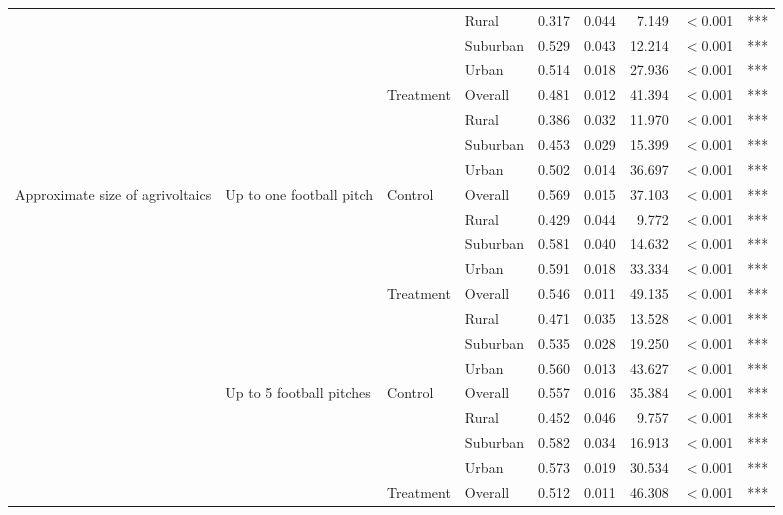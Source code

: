 \begin{longtable}[t]{>{\raggedright\arraybackslash}t{4cm}>{\raggedright\arraybackslash}t{4cm}>{\raggedright\arraybackslash}t{2.5cm}lrrrll}
\nopagebreak
 &  &  & Rural & 0.317 & 0.044 & 7.149 & $<$0.001 & ***\\
\nopagebreak
 &  &  & Suburban & 0.529 & 0.043 & 12.214 & $<$0.001 & ***\\
\nopagebreak
 &  &  & Urban & 0.514 & 0.018 & 27.936 & $<$0.001 & ***\\
\nopagebreak
 &  & Treatment & Overall & 0.481 & 0.012 & 41.394 & $<$0.001 & ***\\
\nopagebreak
 &  &  & Rural & 0.386 & 0.032 & 11.970 & $<$0.001 & ***\\
\nopagebreak
 &  &  & Suburban & 0.453 & 0.029 & 15.399 & $<$0.001 & ***\\
\nopagebreak
 &  &  & Urban & 0.502 & 0.014 & 36.697 & $<$0.001 & ***\\
\pagebreak[0]
Approximate size of agrivoltaics & Up to one football pitch & Control & Overall & 0.569 & 0.015 & 37.103 & $<$0.001 & ***\\
\nopagebreak
 &  &  & Rural & 0.429 & 0.044 & 9.772 & $<$0.001 & ***\\
\nopagebreak
 &  &  & Suburban & 0.581 & 0.040 & 14.632 & $<$0.001 & ***\\
\nopagebreak
 &  &  & Urban & 0.591 & 0.018 & 33.334 & $<$0.001 & ***\\
\nopagebreak
 &  & Treatment & Overall & 0.546 & 0.011 & 49.135 & $<$0.001 & ***\\
\nopagebreak
 &  &  & Rural & 0.471 & 0.035 & 13.528 & $<$0.001 & ***\\
\nopagebreak
 &  &  & Suburban & 0.535 & 0.028 & 19.250 & $<$0.001 & ***\\
\nopagebreak
 &  &  & Urban & 0.560 & 0.013 & 43.627 & $<$0.001 & ***\\
\nopagebreak
 & Up to 5 football pitches & Control & Overall & 0.557 & 0.016 & 35.384 & $<$0.001 & ***\\
\nopagebreak
 &  &  & Rural & 0.452 & 0.046 & 9.757 & $<$0.001 & ***\\
\nopagebreak
 &  &  & Suburban & 0.582 & 0.034 & 16.913 & $<$0.001 & ***\\
\nopagebreak
 &  &  & Urban & 0.573 & 0.019 & 30.534 & $<$0.001 & ***\\
\nopagebreak
 &  & Treatment & Overall & 0.512 & 0.011 & 46.308 & $<$0.001 & ***\\

\end{longtable}
